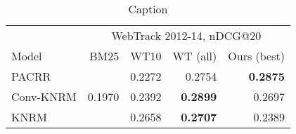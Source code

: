 \begin{table}
\centering
\small
\caption{Caption}
\begin{tabular}{lrrrr}
\toprule
&\multicolumn{4}{c}{WebTrack 2012-14, nDCG@20} \\\cmidrule(lr){2-5}
        Model & \cellcolor{black!15} BM25 & WT10 & WT (all) & Ours (best) \\
\midrule



PACRR & \cellcolor{black!15} & 0.2272 & 0.2754 & \bf 0.2875 \\
Conv-KNRM & 0.1970  \cellcolor{black!15} & 0.2392 & \bf 0.2899 & 0.2697 \\
KNRM & \cellcolor{black!15} & 0.2658 & \bf 0.2707 & 0.2389 \\


\bottomrule
\end{tabular}
\label{tab:my_label}
\end{table}
